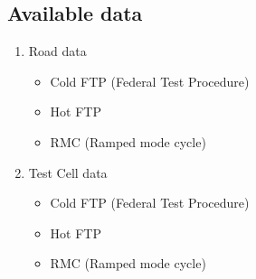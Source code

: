 \subsection{Available data}
\begin{enumerate}
    \item Road data
    \begin{itemize}
        \item Cold FTP (Federal Test Procedure)
        \item Hot FTP
        \item RMC (Ramped mode cycle)
    \end{itemize}
    \item Test Cell data
    \begin{itemize}
        \item Cold FTP (Federal Test Procedure)
        \item Hot FTP
        \item RMC (Ramped mode cycle)
    \end{itemize}

\end{enumerate}

